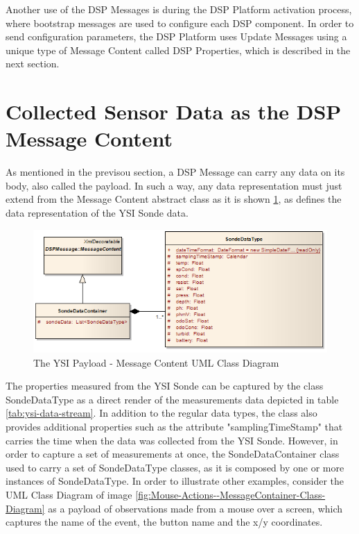 Another use of the DSP Messages is during the DSP Platform activation process,
where bootstrap messages are used to configure each DSP component. In order to
send configuration parameters, the DSP Platform uses Update Messages using a
unique type of Message Content called DSP Properties, which is described in the
next section.

\section{Collected Sensor Data as the DSP Message Content}
\label{sec:dsp-payload-implementation}

As mentioned in the previsou section, a DSP Message can carry any data on its
body, also called the payload. In such a way, any data representation must
just extend from the Message Content abstract class as it is shown
\ref{fig:Sonde-MessageContainer-Class-Diagram}, as defines the data
representation of the YSI Sonde data.

\begin{figure}[!h]
  \centering
  \includegraphics[scale=0.6]{../diagrams/Sonde-MessageContainer-Class-Diagram}
  \caption{The YSI Payload - Message Content UML Class Diagram}
  \label{fig:Sonde-MessageContainer-Class-Diagram}
\end{figure}

The properties measured from the YSI Sonde can be captured by the class
SondeDataType as a direct render of the measurements data depicted in table
\ref{tab:ysi-data-stream}. In addition to the regular data types, the class
also provides additional properties such as the attribute "samplingTimeStamp"
that carries the time when the data was collected from the YSI Sonde. However,
in order to capture a set of measurements at once, the SondeDataContainer
class used to carry a set of SondeDataType classes, as it is composed by one
or more instances of SondeDataType. In order to illustrate other examples,
consider the UML Class Diagram \cite{uml} of image
\ref{fig:Mouse-Actions--MessageContainer-Class-Diagram} as a payload of
observations made from a mouse over a screen, which captures the name of the
event, the button name and the x/y coordinates.

